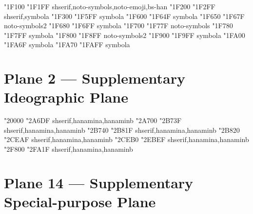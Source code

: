 \documentclass{article}
\begin{document}
               { "1F100} { "1F1FF} {shserif,noto-symbols,noto-emoji,bs-han}
                { "1F200} { "1F2FF} {shserif,symbola}
          { "1F300} { "1F5FF} {symbola}
                                      { "1F600} { "1F64F} {symbola}
                            { "1F650} { "1F67F} {noto-symbols2}
                      { "1F680} { "1F6FF} {symbola}
                             { "1F700} { "1F77F} {noto-symbols}
                      { "1F780} { "1F7FF} {symbola}
                          { "1F800} { "1F8FF} {noto-symbols2}
           { "1F900} { "1F9FF} {symbola}
                                  { "1FA00} { "1FA6F} {symbola}
             { "1FA70} { "1FAFF} {symbola}

\section{Plane 2 --- Supplementary Ideographic Plane}

             { "20000} { "2A6DF} {shserif,hanamina,hanaminb}
             { "2A700} { "2B73F} {shserif,hanamina,hanaminb}
             { "2B740} { "2B81F} {shserif,hanamina,hanaminb}
             { "2B820} { "2CEAF} {shserif,hanamina,hanaminb}
             { "2CEB0} { "2EBEF} {shserif,hanamina,hanaminb}
        { "2F800} { "2FA1F} {shserif,hanamina,hanaminb}



\section{Plane 14 --- Supplementary Special-purpose Plane}
\end{document}
